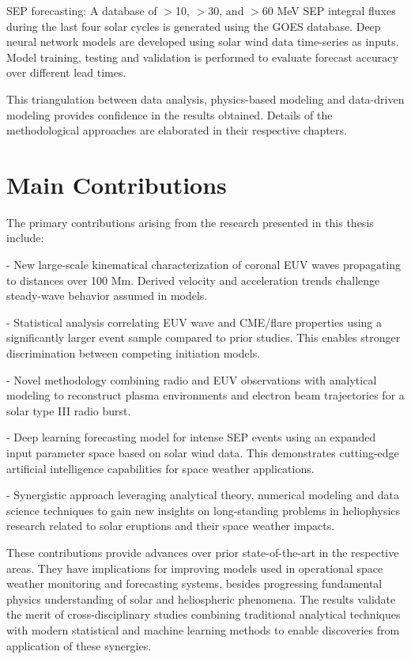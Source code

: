 SEP forecasting: A database of $>$10, $>$30, and $>$60 MeV SEP integral fluxes during the last four solar cycles is generated using the GOES database. Deep neural network models are developed using solar wind data time-series as inputs. Model training, testing and validation is performed to evaluate forecast accuracy over different lead times.

This triangulation between data analysis, physics-based modeling and data-driven modeling provides confidence in the results obtained. Details of the methodological approaches are elaborated in their respective chapters.

\section{Main Contributions}
The primary contributions arising from the research presented in this thesis include:

- New large-scale kinematical characterization of coronal EUV waves propagating to distances over 100 Mm. Derived velocity and acceleration trends challenge steady-wave behavior assumed in models. 

- Statistical analysis correlating EUV wave and CME/flare properties using a significantly larger event sample compared to prior studies. This enables stronger discrimination between competing initiation models.

- Novel methodology combining radio and EUV observations with analytical modeling to reconstruct plasma environments and electron beam trajectories for a solar type III radio burst.

- Deep learning forecasting model for intense SEP events using an expanded input parameter space based on solar wind data. This demonstrates cutting-edge artificial intelligence capabilities for space weather applications.

- Synergistic approach leveraging analytical theory, numerical modeling and data science techniques to gain new insights on long-standing problems in heliophysics research related to solar eruptions and their space weather impacts. 

These contributions provide advances over prior state-of-the-art in the respective areas. They have implications for improving models used in operational space weather monitoring and forecasting systems, besides progressing fundamental physics understanding of solar and heliospheric phenomena. The results validate the merit of cross-disciplinary studies combining traditional analytical techniques with modern statistical and machine learning methods to enable discoveries from application of these synergies.

